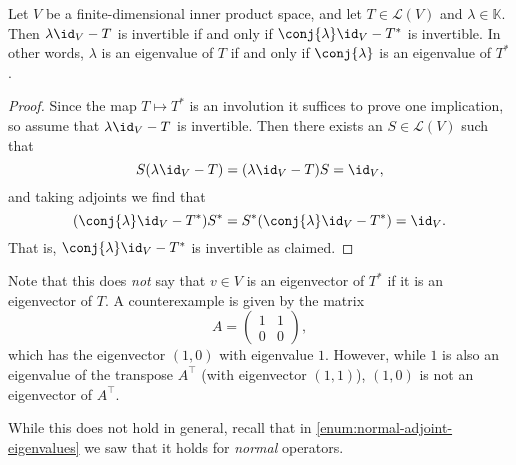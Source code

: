 \documentclass[article, a4paper, 11pt, oneside]{memoir}
\numberwithin{equation}{chapter}
\newcommand{\calL}{\mathcal{L}}
\newcommand{\trans}{^{\top}}
\begin{document}
\begin{proposition}
    Let $V$ be a finite-dimensional inner product space, and let $T \in \calL(V)$ and $\lambda \in \mathbb{K}$. Then $\lambda \id_V - T$ is invertible if and only if $\conj{\lambda} \id_V - T^*$ is invertible. In other words, $\lambda$ is an eigenvalue of $T$ if and only if $\conj{\lambda}$ is an eigenvalue of $T^*$.
\end{proposition} %

\begin{proof}
    Since the map $T \mapsto T^*$ is an involution it suffices to prove one implication, so assume that $\lambda \id_V - T$ is invertible. Then there exists an $S \in \calL(V)$ such that
    \begin{equation*}
        S(\lambda \id_V - T)
            = (\lambda \id_V - T)S
            = \id_V,
    \end{equation*}
    and taking adjoints we find that
    \begin{equation*}
        (\conj{\lambda} \id_V - T^*)S^*
            = S^*(\conj{\lambda} \id_V - T^*)
            = \id_V.
    \end{equation*}
    That is, $\conj{\lambda} \id_V - T^*$ is invertible as claimed.
\end{proof}

\begin{remark}
    Note that this does \emph{not} say that $v \in V$ is an eigenvector of $T^*$ if it is an eigenvector of $T$. A counterexample is given by the matrix
    \begin{equation*}
        A =
        \begin{pmatrix}
            1 & 1 \\
            0 & 0
        \end{pmatrix},
    \end{equation*}
    which has the eigenvector $(1,0)$ with eigenvalue $1$. However, while $1$ is also an eigenvalue of the transpose $A\trans$ (with eigenvector $(1,1)$), $(1,0)$ is not an eigenvector of $A\trans$.

    While this does not hold in general, recall that in \cref{enum:normal-adjoint-eigenvalues} we saw that it holds for \emph{normal} operators.
\end{remark}
\end{document}
